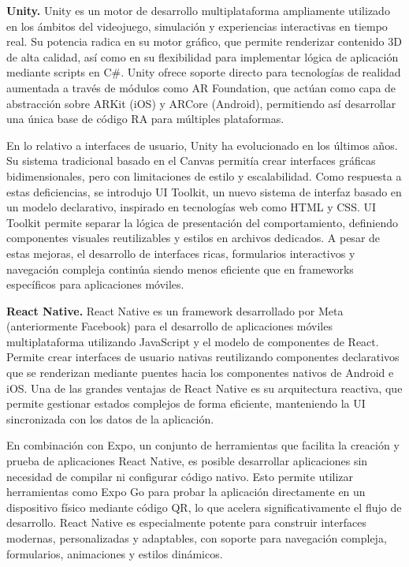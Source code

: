 \textbf{Unity.} Unity es un motor de desarrollo multiplataforma ampliamente utilizado en los ámbitos del videojuego, simulación y experiencias interactivas en tiempo real. Su potencia radica en su motor gráfico, que permite renderizar contenido 3D de alta calidad, así como en su flexibilidad para implementar lógica de aplicación mediante scripts en C\#. Unity ofrece soporte directo para tecnologías de realidad aumentada a través de módulos como AR Foundation, que actúan como capa de abstracción sobre ARKit (iOS) y ARCore (Android), permitiendo así desarrollar una única base de código RA para múltiples plataformas.

En lo relativo a interfaces de usuario, Unity ha evolucionado en los últimos años. Su sistema tradicional basado en el Canvas permitía crear interfaces gráficas bidimensionales, pero con limitaciones de estilo y escalabilidad. Como respuesta a estas deficiencias, se introdujo UI Toolkit, un nuevo sistema de interfaz basado en un modelo declarativo, inspirado en tecnologías web como HTML y CSS. UI Toolkit permite separar la lógica de presentación del comportamiento, definiendo componentes visuales reutilizables y estilos en archivos dedicados. A pesar de estas mejoras, el desarrollo de interfaces ricas, formularios interactivos y navegación compleja continúa siendo menos eficiente que en frameworks específicos para aplicaciones móviles.

\textbf{React Native.} React Native es un framework desarrollado por Meta (anteriormente Facebook) para el desarrollo de aplicaciones móviles multiplataforma utilizando JavaScript y el modelo de componentes de React. Permite crear interfaces de usuario nativas reutilizando componentes declarativos que se renderizan mediante puentes hacia los componentes nativos de Android e iOS. Una de las grandes ventajas de React Native es su arquitectura reactiva, que permite gestionar estados complejos de forma eficiente, manteniendo la UI sincronizada con los datos de la aplicación.

En combinación con Expo, un conjunto de herramientas que facilita la creación y prueba de aplicaciones React Native, es posible desarrollar aplicaciones sin necesidad de compilar ni configurar código nativo. Esto permite utilizar herramientas como Expo Go para probar la aplicación directamente en un dispositivo físico mediante código QR, lo que acelera significativamente el flujo de desarrollo. React Native es especialmente potente para construir interfaces modernas, personalizadas y adaptables, con soporte para navegación compleja, formularios, animaciones y estilos dinámicos.

